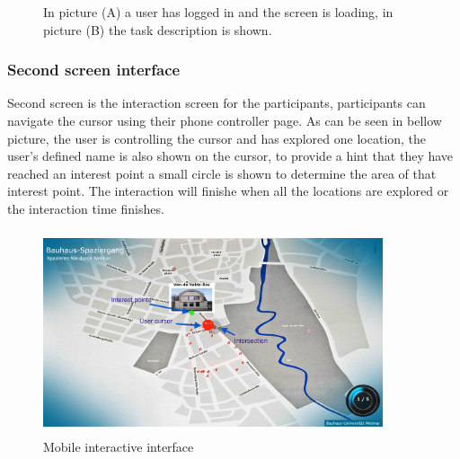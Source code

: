 \begin{figure}[!htb]
    \centering
    \caption{In picture (A) a user has logged in and the screen is loading, in picture (B) the task description is shown.}%
    \label{fig:Switching_between_phases_mobile}%
\end{figure}



\subsubsection{Second screen interface}
Second screen is the interaction screen for the participants, participants can navigate the cursor using their phone controller page. As can be seen in bellow picture, the user is controlling the cursor and has explored one location, the user's defined name is also shown on the cursor, to provide a hint that they have reached an interest point a small circle is shown to determine the area of that interest point. The interaction will finishe when all the locations are explored or the interaction time finishes.


\begin{figure}[H]
    \centering
    \includegraphics[width=100mm,height=60mm]{Figures/7/mobile_interactive/second_interface}
    \caption{Mobile interactive interface}%
    \label{fig:mobile_secondinterface}%
\end{figure}



